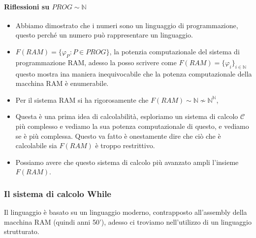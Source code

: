 \documentclass{article}
\begin{document}
\paragraph{Riflessioni su $PROG\sim\mathbb{N}$}
\begin{itemize}
    \item Abbiamo dimostrato che i numeri sono un linguaggio di programmazione, questo
          perché un numero può rappresentare un linguaggio.

    \item $F(RAM)=\{\varphi_P :P\in PROG\}$, la potenzia computazionale del sistema di programmazione
          RAM, adesso la posso scrivere come $F(RAM)=\{\varphi_i\}_{i\in\mathbb{N}}$ questo mostra ina maniera inequivocabile che la potenza
          computazionale della macchina RAM è enumerabile.

    \item Per il sistema RAM si ha rigorosamente che $F(RAM)\sim\mathbb{N}\nsim\mathbb{N}^{\mathbb{N}}$,

    \item Questa è una prima idea di calcolabilità, esploriamo un sistema di calcolo $\mathcal{C}$ più complesso
          e vediamo la sua potenza computazionale di questo, e vediamo se è più complessa. Questo va fatto è onestamente
          dire che ciò che è calcolabile sia $F(RAM)$ è troppo restrittivo.

    \item Possiamo avere che questo sistema di calcolo più avanzato ampli l'insieme $F(RAM)$.
\end{itemize}

\subsubsection{Il sistema di calcolo While}
Il linguaggio è basato su un linguaggio moderno, contrapposto all'assembly della macchina RAM (quindi
anni 50'), adesso ci troviamo nell'utilizzo di un linguaggio strutturato.
\end{document}
